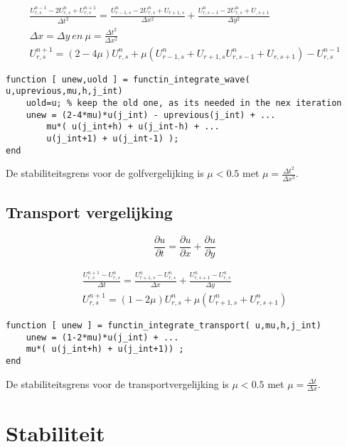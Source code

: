 \documentclass[11pt]{article} %
\begin{document}
		\begin{eqnarray}
			\frac{U_{r,s}^{n-1} - 2U_{r,s}^{n}+U_{r,s}^{n+1} }{\Delta t^2} 
			=
			\frac{U_{r-1,s}^n - 2 U_{r,s}^n + U_{r+1,s}}{\Delta x^2} + 
			\frac{U_{r,s-1}^n - 2 U_{r,s}^n + U_{,s+1} }{\Delta y^2} \\
			\Delta x = \Delta y  \ en \  \mu=\frac{\Delta t^2}{\Delta x^2} \\
			U_{r,s}^{n+1} = ( 2-4\mu )U_{r,s}^n + \mu (U_{r-1,s}^n  + U_{r+1,s}
			U_{r,s-1}^n  + U_{r,s+1}) - U_{r,s}^{n-1}
		\end{eqnarray}
\begin{lstlisting}[caption=Code Explicit Euler,label={lst:expl_euler}]
function [ unew,uold ] = functin_integrate_wave( u,uprevious,mu,h,j_int)
	uold=u; % keep the old one, as its needed in the nex iteration
	unew = (2-4*mu)*u(j_int) - uprevious(j_int) + ...
		mu*( u(j_int+h) + u(j_int-h) + ...
		u(j_int+1) + u(j_int-1) );
end
\end{lstlisting}
De stabiliteitsgrens voor de golfvergelijking is $\mu < 0.5 $ met $\mu=\frac{\Delta t^2}{\Delta x^2}$.  

	\subsection{Transport vergelijking}
		\begin{equation}
			\frac{\partial u}{\partial t} = \frac{\partial u}{\partial x} + \frac{\partial u}{\partial y}
		\end{equation}
		
		\begin{eqnarray}
			\frac{U_{r,s}^{n+1} - U_{r,s}^n}{\Delta t} = 
			\frac{U^n_{r+1,s} -U^n_{r,s}}{\Delta x} +
			\frac{U^n_{r,s+1} -U^n_{r,s}}{\Delta y} \\
			U_{r,s}^{n+1} = (1 - 2 \mu)U^n_{r,s} + \mu (U^n_{r+1,s}+U^n_{r,s+1})
		\end{eqnarray}
\begin{lstlisting}[caption=Code Explicit Euler,label={lst:expl_euler}]
function [ unew ] = functin_integrate_transport( u,mu,h,j_int)
	unew = (1-2*mu)*u(j_int) + ... 
	mu*( u(j_int+h) + u(j_int+1)) ;
end
\end{lstlisting}
De stabiliteitsgrens voor de transportvergelijking is $\mu < 0.5 $ met $\mu=\frac{\Delta t}{\Delta x}$.  

\clearpage
\section{Stabiliteit}
\end{document}

